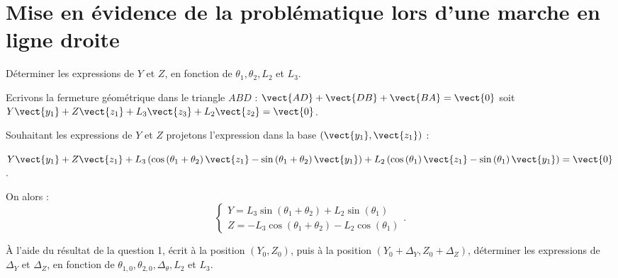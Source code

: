 \documentclass[11pt]{article}
\begin{document}
\UPSTIpreambuleEpreuve	%



\section{Mise en évidence de la problématique lors d'une marche en ligne droite}



\UPSTIquestion Déterminer les expressions de $Y$ et $Z$, en fonction de $\theta_{1}, \theta_{2}, L_{2}$ et $L_{3}$.

\begin{UPSTIcorrige}
Ecrivons la fermeture géométrique dans le triangle $ABD$ : $\vect{AD}+ \vect{DB}+\vect{BA} = \vect{0}$ soit $Y\vect{y_1}+Z\vect{z_1}+ L_3 \vect{z_3}+ L_2 \vect{z_2} = \vect{0}$.

Souhaitant les expressions de $Y$ et $Z$ projetons l'expression dans la base $\left(\vect{y_1},\vect{z_1}\right)$ :

$Y\vect{y_1}+Z\vect{z_1}
+L_3 \left( \cos \left(\theta_1 + \theta_2 \right) \vect{z_1} - \sin \left(\theta_1 + \theta_2 \right) \vect{y_1}\right) 
+ L_2 \left( \cos \left(\theta_1 \right) \vect{z_1} - \sin \left(\theta_1  \right) \vect{y_1}\right)  = \vect{0}$.

On alors :
$$
\left\{
\begin{array}{l}
Y =  L_3 \sin  \left(\theta_1 + \theta_2 \right)  + L_2 \sin \left(\theta_1  \right) \\
Z =- L_3 \cos \left(\theta_1 + \theta_2 \right) - L_2 \cos \left(\theta_1 \right)  
\end{array}.
\right.
$$

\end{UPSTIcorrige}

\UPSTIquestion À l'aide du résultat de la question 1, écrit à la position $\left(Y_{0}, Z_{0}\right)$, puis à la position $\left(Y_{0}+\Delta_{Y}, Z_{0}+\Delta_{Z}\right)$, déterminer les expressions de $\Delta_{Y}$ et $\Delta_{Z}$, en fonction de $\theta_{1,0}, \theta_{2,0}, \Delta_{\theta}, L_{2}$ et $L_{3}$.
\begin{UPSTIcorrige}

\end{UPSTIcorrige}
\end{document}
